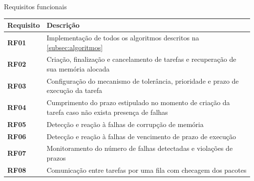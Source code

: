 \begin{quadro}[H]
    \centering
    \caption{Requisitos funcionais}
    \begin{tabular}{|p{}|p{}|}
        \hline
        \rowcolor[HTML]{C0C0C0}
        \textbf{Requisito} & \textbf{Descrição}  \\
        \hline
        
        \textbf{RF01} & Implementação de todos os algoritmos descritos na \autoref{subsec:algoritmos} \\ 
        \hline

        \textbf{RF02} & Criação, finalização e cancelamento de tarefas e recuperação de sua memória alocada \\
        \hline
        
        \textbf{RF03} & Configuração do mecanismo de tolerância, prioridade e prazo de execução da tarefa \\
        \hline

        \textbf{RF04} & Cumprimento do prazo estipulado no momento de criação da tarefa caso não exista presença de falhas \\
        \hline

        \textbf{RF05} & Detecção e reação à falhas de corrupção de memória \\
        \hline

        \textbf{RF06} & Detecção e reação à falhas de vencimento de prazo de execução \\
        \hline
        
        \textbf{RF07} & Monitoramento do número de falhas detectadas e violações de prazos  \\
        \hline
        
        \textbf{RF08} & Comunicação entre tarefas por uma fila com checagem dos pacotes \\
        \hline
    \end{tabular}
    \label{tab:rf}
\end{quadro}

